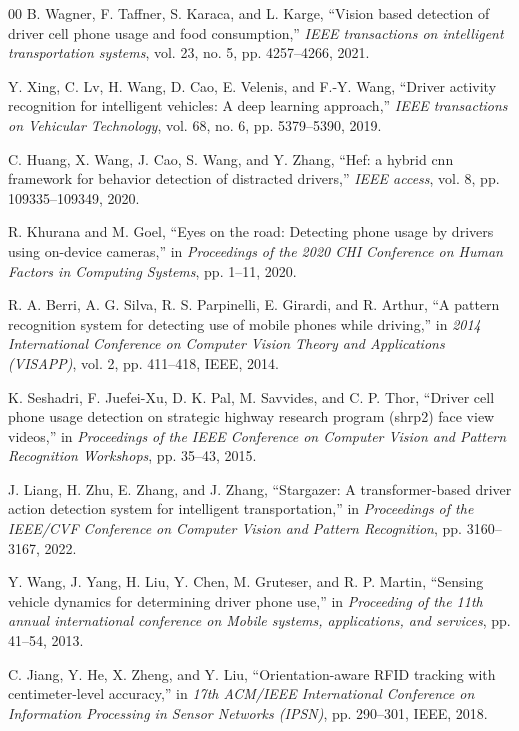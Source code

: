 \documentclass[journal, onecolumn]{IEEEtran}
\begin{document}
\begin{thebibliography}{00}
 B. Wagner, F. Taffner, S. Karaca, and L. Karge, “Vision based detection of driver cell phone usage and food consumption,” \emph{IEEE transactions on intelligent transportation systems}, vol. 23, no. 5, pp. 4257–4266, 2021.

 Y. Xing, C. Lv, H. Wang, D. Cao, E. Velenis, and F.-Y. Wang, “Driver activity recognition for intelligent vehicles: A deep learning approach,” \emph{IEEE transactions on Vehicular Technology}, vol. 68, no. 6, pp. 5379–5390, 2019.

 C. Huang, X. Wang, J. Cao, S. Wang, and Y. Zhang, “Hef: a hybrid cnn framework for behavior detection of distracted drivers,” \emph{IEEE access}, vol. 8, pp. 109335–109349, 2020.

 R. Khurana and M. Goel, “Eyes on the road: Detecting phone usage by drivers using on-device cameras,” in \emph{Proceedings of the 2020 CHI Conference on Human Factors in Computing Systems}, pp. 1–11, 2020.

 R. A. Berri, A. G. Silva, R. S. Parpinelli, E. Girardi, and R. Arthur, “A pattern recognition system for detecting use of mobile phones while driving,” in \emph{2014 International Conference on Computer Vision Theory and Applications (VISAPP)}, vol. 2, pp. 411–418, IEEE, 2014.

 K. Seshadri, F. Juefei-Xu, D. K. Pal, M. Savvides, and C. P. Thor, “Driver cell phone usage detection on strategic highway research program (shrp2) face view videos,” in \emph{Proceedings of the IEEE Conference on Computer Vision and Pattern Recognition Workshops}, pp. 35–43, 2015.

 J. Liang, H. Zhu, E. Zhang, and J. Zhang, “Stargazer: A transformer-based driver action detection system for intelligent transportation,” in \emph{Proceedings of the IEEE/CVF Conference on Computer Vision and Pattern Recognition}, pp. 3160–3167, 2022.

 Y. Wang, J. Yang, H. Liu, Y. Chen, M. Gruteser, and R. P. Martin, “Sensing vehicle dynamics for determining driver phone use,” in \emph{Proceeding of the 11th annual international conference on Mobile systems, applications, and services}, pp. 41–54, 2013.

 C. Jiang, Y. He, X. Zheng, and Y. Liu, “Orientation-aware RFID tracking with centimeter-level accuracy,” in \emph{17th ACM/IEEE International Conference on Information Processing in Sensor Networks (IPSN)}, pp. 290–301, IEEE, 2018.


\end{thebibliography}
\end{document}
